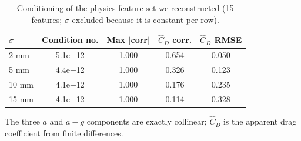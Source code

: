 \begin{table}[htbp]
\centering
\caption{Conditioning of the physics feature set we reconstructed (15 features; $\sigma$ excluded because it is constant per row).}
\label{tab:p0-features}
\begin{tabular}{lcccc}
\toprule
$\sigma$ & Condition no. & Max $|$corr$|$ & $\hat C_D$ corr. & $\hat C_D$ RMSE \\
\midrule
2 mm & 5.1e+12 & 1.000 & 0.654 & 0.050 \\
5 mm & 4.4e+12 & 1.000 & 0.326 & 0.123 \\
10 mm & 4.1e+12 & 1.000 & 0.176 & 0.235 \\
15 mm & 4.1e+12 & 1.000 & 0.114 & 0.328 \\
\bottomrule
\end{tabular}
\par\smallskip\footnotesize The three $a$ and $a-g$ components are exactly collinear; $\hat C_D$ is the apparent drag coefficient from finite differences.
\end{table}
